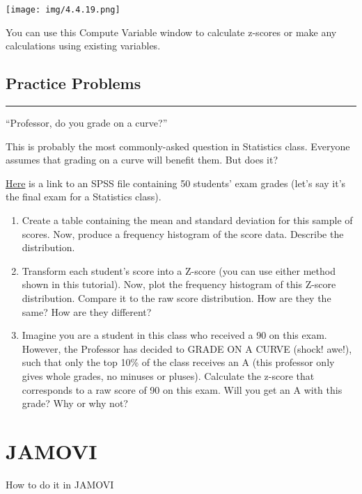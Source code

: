 \documentclass[]{book}
\begin{document}
\texttt{[image: img/4.4.19.png]}

You can use this Compute Variable window to calculate z-scores or make
any calculations using existing variables.

\subsection{Practice Problems}\label{practice-problems-4}

\begin{center}\rule{0.5\linewidth}{0.5pt}\end{center}

``Professor, do you grade on a curve?''

This is probably the most commonly-asked question in Statistics class.
Everyone assumes that grading on a curve will benefit them. But does it?

\href{https://github.com/CrumpLab/statisticsLab/blob/master/data/spssdata/StatsGrades.sav}{Here}
is a link to an SPSS file containing 50 students' exam grades (let's say
it's the final exam for a Statistics class).

\begin{enumerate}
\def\labelenumi{\arabic{enumi}.}
\item
  Create a table containing the mean and standard deviation for this
  sample of scores. Now, produce a frequency histogram of the score
  data. Describe the distribution.
\item
  Transform each student's score into a Z-score (you can use either
  method shown in this tutorial). Now, plot the frequency histogram of
  this Z-score distribution. Compare it to the raw score distribution.
  How are they the same? How are they different?
\item
  Imagine you are a student in this class who received a 90 on this
  exam. However, the Professor has decided to GRADE ON A CURVE (shock!
  awe!), such that only the top 10\% of the class receives an A (this
  professor only gives whole grades, no minuses or pluses). Calculate
  the z-score that corresponds to a raw score of 90 on this exam. Will
  you get an A with this grade? Why or why not?
\end{enumerate}

\section{JAMOVI}\label{jamovi-4}

How to do it in JAMOVI
\end{document}
